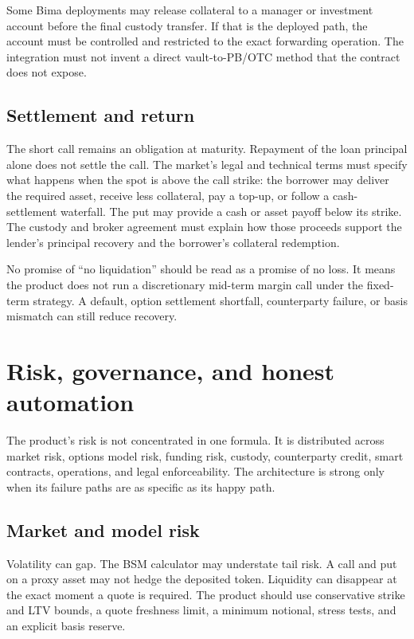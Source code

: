 \documentclass[11pt,oneside]{article}
\begin{document}
Some Bima deployments may release collateral to a manager or investment account before the final custody transfer. If that is the deployed path, the account must be controlled and restricted to the exact forwarding operation. The integration must not invent a direct vault-to-PB/OTC method that the contract does not expose.

\subsection{Settlement and return}

The short call remains an obligation at maturity. Repayment of the loan principal alone does not settle the call. The market's legal and technical terms must specify what happens when the spot is above the call strike: the borrower may deliver the required asset, receive less collateral, pay a top-up, or follow a cash-settlement waterfall. The put may provide a cash or asset payoff below its strike. The custody and broker agreement must explain how those proceeds support the lender's principal recovery and the borrower's collateral redemption.

No promise of ``no liquidation'' should be read as a promise of no loss. It means the product does not run a discretionary mid-term margin call under the fixed-term strategy. A default, option settlement shortfall, counterparty failure, or basis mismatch can still reduce recovery.

\section{Risk, governance, and honest automation}

The product's risk is not concentrated in one formula. It is distributed across market risk, options model risk, funding risk, custody, counterparty credit, smart contracts, operations, and legal enforceability. The architecture is strong only when its failure paths are as specific as its happy path.

\subsection{Market and model risk}

Volatility can gap. The BSM calculator may understate tail risk. A call and put on a proxy asset may not hedge the deposited token. Liquidity can disappear at the exact moment a quote is required. The product should use conservative strike and LTV bounds, a quote freshness limit, a minimum notional, stress tests, and an explicit basis reserve.
\end{document}
